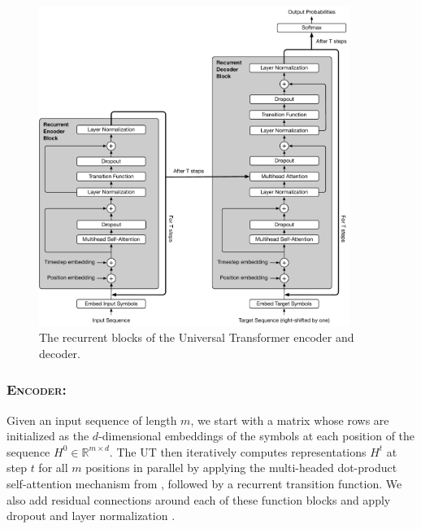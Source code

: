 \begin{figure}[t]
 \centering
 \includegraphics[width=0.9\textwidth]{04-part-03/chapter-06/figs_and_tables/fig_universal-transformer-complete.pdf}
 \caption{The recurrent blocks of the Universal Transformer encoder and decoder.}
 \label{fig:universal-transformer-complete}
\end{figure}

\subsubsection{\textsc{Encoder:}}
Given an input sequence of length $m$, we start with a matrix whose rows are initialized as the $d$-dimensional embeddings of the symbols at each position of the sequence $H^0 \in \mathbb{R}^{m \times d}$. The UT then iteratively computes representations $H^t$ at step $t$ for all $m$ positions in parallel by applying the multi-headed dot-product self-attention mechanism from \cite{transformer}, followed by a recurrent transition function. We also add residual connections around each of these function blocks and apply dropout and layer normalization \citep{srivastava2014dropout, layernorm2016}.

